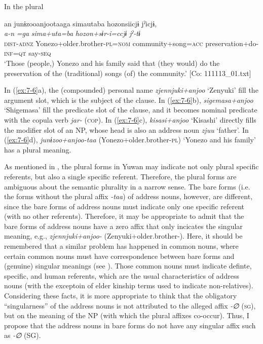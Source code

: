 \ex \label{ex:7:6d}In the plural

{\TM}
\glll an  junɨzooanjootaaga  simautaba hozonsiicjɨ  jˀicjɨ,\\
\textit{a-n}  \textit{=ga}  \textit{sima+uta=ba}  \textit{hozon+sɨr-i=ccjɨ}  \textit{jˀ-tɨ}\\
      \textsc{dist}-\textsc{adnz}  Yonezo+older.brother-\textsc{pl}=\textsc{nom}  community+song=\textsc{acc}         preservation+do-\textsc{inf}=\textsc{qt}  say-\textsc{seq}\\
\glt    ‘Those (people,) Yonezo and his family said that (they would) do the preservation of the (traditional) songs (of) the community.’      [Co: 111113\_01.txt]

  \z
\z

In (\ref{ex:7-6}a), the (compounded) personal name \textit{zjennjuki+anjoo} ‘Zenyuki’ fill the argument slot, which is the subject of the clause. In (\ref{ex:7-6}b), \textit{sigemasa+anjoo} ‘Shigemasa’ fill the predicate slot of the clause, and it becomes nominal predicate with the copula verb \textit{jar-} (\textsc{cop}). In (\ref{ex:7-6}c), \textit{kisasi+anjoo} ‘Kisashi’ directly fills the modifier slot of an NP, whose head is also an address noun \textit{zjuu} ‘father’. In (\ref{ex:7-6}d), \textit{junɨzoo+anjoo-taa} (Yonezo+older.brother-\textsc{pl}) ‘Yonezo and his family’ has a plural meaning.

  As mentioned in , the plural forms in Yuwan may indicate not only plural specific referents, but also a single specific referent. Therefore, the plural forms are ambiguous about the semantic plurality in a narrow sense. The bare forms (i.e. the forms without the plural affix \textit{{}-taa}) of address nouns, however, are different, since the bare forms of address nouns must indicate only one specific referent (with no other referents). Therefore, it may be appropriate to admit that the bare forms of address nouns have a zero affix that only incicates the singular meaning, e.g., \textit{zjennjuki+anjoo-} (Zenyuki+older.brother-\textsc{}). Here, it should be remembered that a similar problem has happened in common nouns, where certain common nouns must have correspondence between bare forms and (genuine) singular meanings (see ). Those common nouns must indicate definte, specific, and human referents, which are the usual characteristics of address nouns (with the exceptoin of elder kinship terms used to indicate non-relatives). Considering these facts, it is more appropriate to think that the obligatory “singularness” of the address nouns is not attributed to the alleged affix \textit{{}-∅} (\textsc{sg}), but on the meaning of the NP (with which the plural affixes co-occur). Thus, I propose that the address nouns in bare forms do not have any singular affix such as \textit{{}-∅} (SG).

